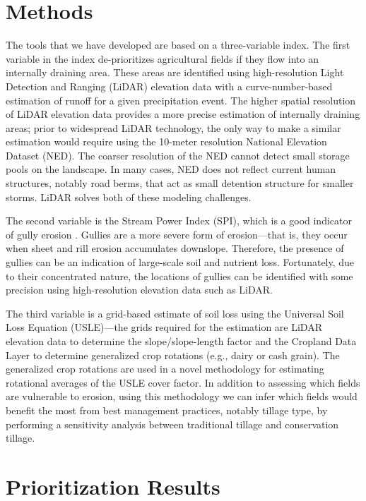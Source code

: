 \documentclass[12pt]{article}
\begin{document}
\section{Methods}
The tools that we have developed are based on a three-variable index. The first variable in the index de-prioritizes agricultural fields if they flow into an internally draining area. These areas are identified using high-resolution Light Detection and Ranging (LiDAR) elevation data with a curve-number-based estimation \cite{aron_infiltration_1977} of runoff for a given precipitation event. The higher spatial resolution of LiDAR elevation data provides a more precise estimation of internally draining areas; prior to widespread LiDAR technology, the only way to make a similar estimation would require using the 10-meter resolution National Elevation Dataset (NED). The coarser resolution of the NED cannot detect small storage pools on the landscape. In many cases, NED does not reflect current human structures, notably road berms, that act as small detention structure for smaller storms. LiDAR solves both of these modeling challenges.

The second variable is the Stream Power Index (SPI), which is a good indicator of gully erosion \cite{galzki_identifying_2011}. Gullies are a more severe form of erosion---that is, they occur when sheet and rill erosion accumulates downslope. Therefore, the presence of gullies can be an indication of large-scale soil and nutrient loss. Fortunately, due to their concentrated nature, the locations of gullies can be identified with some precision using high-resolution elevation data such as LiDAR.

The third variable is a grid-based estimate of soil loss using the Universal Soil Loss Equation (USLE)---the grids required for the estimation are LiDAR elevation data to determine the slope/slope-length factor and the Cropland Data Layer \cite{boryan_monitoring_2011} to determine generalized crop rotations (e.g., dairy or cash grain). The generalized crop rotations are used in a novel methodology for estimating rotational averages of the USLE cover factor. In addition to assessing which fields are vulnerable to erosion, using this methodology we can infer which fields would benefit the most from best management practices, notably tillage type, by performing a sensitivity analysis between traditional tillage and conservation tillage.

\section{Prioritization Results}
\end{document}
